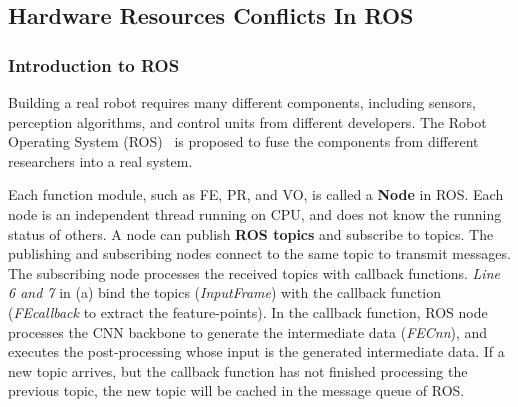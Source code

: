 \subsection{Hardware Resources Conflicts In ROS}
\subsubsection{Introduction to ROS} Building a real robot requires many different components, including sensors, perception algorithms, and control units from different developers. The Robot Operating System (ROS)~\cite{quigley2009ros} is proposed to fuse the components from different researchers into a real system.

Each function module, such as FE, PR, and VO, is called a \textbf{Node} in ROS. Each node is an independent thread running on CPU, and does not know the running status of others. 
A node can publish \textbf{ROS topics} and subscribe to topics. The publishing and subscribing nodes connect to the same topic to transmit messages.
The subscribing node processes the received topics with callback functions. \textit{Line 6 and 7} in (a) bind the topics (\textit{InputFrame}) with the callback function (\textit{FEcallback} to extract the feature-points). In the callback function, ROS node processes the CNN backbone to generate the intermediate data (\textit{FECnn}), and executes the post-processing whose input is the generated intermediate data. If a new topic arrives, but the callback function has not finished processing the previous topic, the new topic will be cached in the message queue of ROS.






